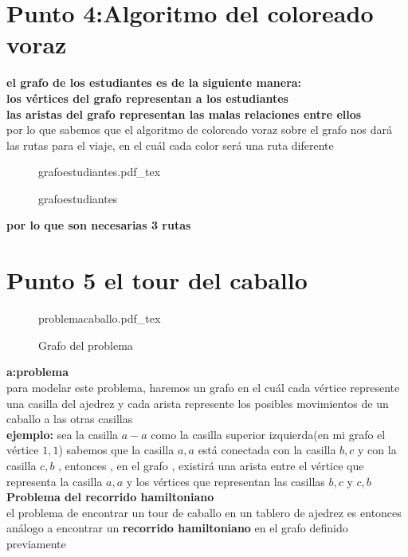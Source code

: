 \documentclass[10pt,a4paper]{article} %
\newcommand{\incfig}[1]{%
    \def\svgwidth{\columnwidth}
    {#1.pdf_tex}
}
\begin{document}
    \newpage
    \section{Punto 4:Algoritmo del coloreado voraz}
    \textbf{el grafo de los estudiantes es de la siguiente manera:}
    \\
    \textbf{los vértices del grafo representan a los estudiantes}
    \\
    \textbf{las aristas del grafo representan las malas relaciones entre ellos}
    \\
    por lo que sabemos que el algoritmo de coloreado voraz sobre el grafo nos
    dará las rutas para el viaje, en el cuál cada color será una ruta diferente
    \begin{figure}[ht]
        \centering
        \incfig{grafoestudiantes}
        \caption{grafoestudiantes}
        \label{fig:grafoestudiantes}
    \end{figure}
    \textbf{por lo que son necesarias 3 rutas}


    \newpage
    \section{Punto 5 el tour del caballo}

    \begin{figure}[ht]
        \centering
        \incfig{problemacaballo}
        \caption{Grafo del problema}
        \label{fig:problemacaballo}
    \end{figure}



    \textbf{a:problema }
    \\
    para modelar este problema, haremos un grafo en el cuál cada vértice
    represente una casilla del ajedrez y cada arista represente los posibles
    movimientos de un caballo a las otras casillas
    \\
    \textbf{ejemplo:} sea la casilla $a-a$ como la casilla superior
    izquierda(en mi grafo el vértice $1,1$) sabemos que la casilla $a,a$ está
    conectada con la casilla $b,c$ y con la casilla $c,b$ , entonces , en el
    grafo , existirá una arista entre el vértice que representa la casilla
    $a,a$ y los vértices que representan las casillas $b,c$ y $c,b$
    \\
    \textbf{Problema del recorrido hamiltoniano}
    \\
    el problema de encontrar  un tour de caballo en un tablero de ajedrez es
    entonces análogo a encontrar un \textbf{recorrido hamiltoniano}  en el grafo definido
    previamente
\end{document}
